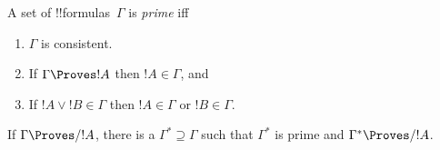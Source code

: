 \documentclass[../../../include/open-logic-section]{subfiles}
\begin{document}


\begin{defn}
  A set of !!{formula}s~$\Gamma$ is \emph{prime} iff 
  \begin{enumerate}
  \item{} $\Gamma$ is consistent.
  \item{} If $\Gamma \Proves !A$ then $!A \in \Gamma$, and
  \item{} If $!A \lor !B \in \Gamma$ then $!A \in
    \Gamma$ or $!B \in \Gamma$.
  \end{enumerate}
\end{defn}

\begin{lem}
   If $\Gamma \Proves/ !A$, there is a
  $\Gamma^* \supseteq \Gamma$ such that $\Gamma^*$ is prime and
  $\Gamma^* \Proves/ !A$.
\end{lem}
\end{document}
